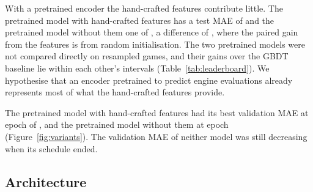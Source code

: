\documentclass[11pt]{article}
\begin{document}
With a pretrained encoder the hand-crafted features contribute little. The
pretrained model with hand-crafted features has a test MAE of
 and the pretrained model
without them one of , a
difference of , where
the paired gain from the features is
 from random
initialisation. The two pretrained models were not compared directly on
resampled games, and their gains over the GBDT baseline lie within each
other's intervals (Table~\ref{tab:leaderboard}). We hypothesise that an
encoder pretrained to predict engine evaluations already represents most of
what the hand-crafted features provide.

The pretrained model with hand-crafted features had its best validation MAE
at epoch  of
, and the pretrained model
without them at epoch 
(Figure~\ref{fig:variants}). The validation MAE of neither model was still
decreasing when its schedule ended.
\fi

\ifshapes
\subsection{Architecture}
\end{document}
